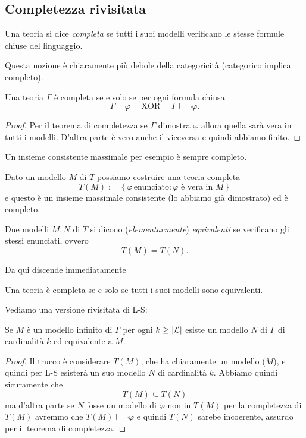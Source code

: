 \documentclass[11pt]{scrartcl}
\begin{document}
 	\subsection{Completezza rivisitata}
 	\begin{definition}
 		Una teoria si dice \textit{completa} se tutti i suoi modelli verificano le stesse formule chiuse del linguaggio.
 	\end{definition}
 	Questa nozione è chiaramente più debole della categoricità (categorico implica completo). 
 	\begin{proposition}
 		Una teoria $\Gamma$ è completa se e solo se per ogni formula chiusa
 		$$\Gamma \vdash \varphi \quad \text{ XOR }\quad  \Gamma\vdash \lnot \varphi.$$
 	\end{proposition}
 	\begin{proof}
 		Per il teorema di completezza se $\Gamma$ dimostra $\varphi$ allora quella sarà vera in tutti i modelli. D'altra parte è vero anche il viceversa e quindi abbiamo finito.
 	\end{proof}
 	Un insieme consistente massimale per esempio è sempre completo.
 	\begin{definition}
 		Dato un modello $M$ di $T$ possiamo costruire una teoria completa
 		$$T(M):=\left\{\varphi\,\text{enunciato}:\varphi \text{ è vera in } M\right\}$$
 		e questo è un insieme massimale consistente (lo abbiamo già dimostrato) ed è completo.
 	\end{definition}
 	\begin{definition}
 		Due modelli $M,N$ di $T$ si dicono (\textit{elementarmente}) \textit{equivalenti} se verificano gli stessi enunciati, ovvero
 		$$T(M)=T(N).$$
 	\end{definition}
 	Da qui discende immediatamente
 	\begin{proposition}
 		Una teoria è completa se e solo se tutti i suoi modelli sono equivalenti.
 	\end{proposition}
 	Vediamo una versione rivisitata di L-S:
 	\begin{proposition}
 		Se $M$ è un modello infinito di $\Gamma$ per ogni $k\ge \left\lvert \mathcal{L} \right\rvert$ esiste un modello $N$ di $\Gamma$ di cardinalità $k$ ed equivalente a $M$.
 	\end{proposition}
 	\begin{proof}
 		Il trucco è considerare $T(M)$, che ha chiaramente un modello ($M$), e quindi per L-S esisterà un suo modello $N$ di cardinalità $k$. Abbiamo quindi sicuramente che
 		$$T(M)\subseteq T(N)$$
 		ma d'altra parte se $N$ fosse un modello di $\varphi$ non in $T(M)$ per la completezza di $T(M)$ avremmo che $T(M)\vdash \lnot\varphi$ e quindi $T(N)$ sarebe incoerente, assurdo per il teorema di completezza.
 	\end{proof}
\end{document}
